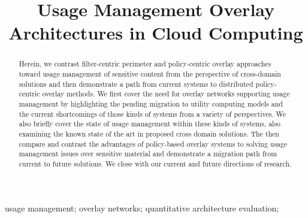 \documentclass[10pt, conference, compsocconf]{IEEEtran}
\begin{document}
\title{Usage Management Overlay Architectures in Cloud Computing}

\author{
\and
{}
}

\maketitle

\begin{abstract}
Herein, we contrast filter-centric perimeter and policy-centric overlay approaches toward usage management of sensitive content from the perspective of cross-domain solutions and then demonstrate a path from current systems to distributed policy-centric overlay methods.  We first cover the need for overlay networks supporting usage management by highlighting the pending migration to utility computing models and the current shortcomings of those kinds of systems from a variety of perspectives.  We also briefly cover the state of usage management within these kinds of systems, also examining the known state of the art in proposed cross domain solutions.  The then compare and contrast the advantages of policy-based overlay systems to solving usage management issues over sensitive material and demonstrate a migration path from current to future solutions.  We close with our current and future directions of research. 
\end{abstract}

\begin{IEEEkeywords}
usage management; overlay networks; quantitative architecture evaluation;

\end{IEEEkeywords}

\IEEEpeerreviewmaketitle




\end{document}
